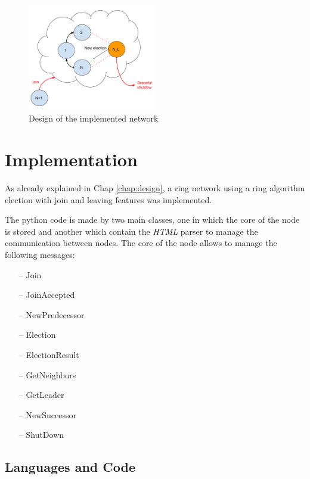 \documentclass[11pt,conference]{IEEEtran}
\begin{document}
\begin{figure}[h!]
  \centering
    \includegraphics[width=0.5\textwidth]{design}
    \caption{Design of the implemented network}
    \label{fig:design}
\end{figure}


\section{Implementation}
As already explained in Chap \ref{chap:design}, a ring network using a ring algorithm election with join and leaving features was implemented.

The python code is made by two main classes, one in which the core of the node is stored and another which contain the \textit{HTML} parser to manage the communication between nodes. The core of the node allows to manage the following messages:
\begin{itemize}
\item[--] Join
\item[--] JoinAccepted
\item[--] NewPredecessor
\item[--] Election
\item[--] ElectionResult
\item[--] GetNeighbors
\item[--] GetLeader
\item[--] NewSuccessor %
\item[--] ShutDown %
\end{itemize}


\subsection{Languages and Code}
\end{document}
